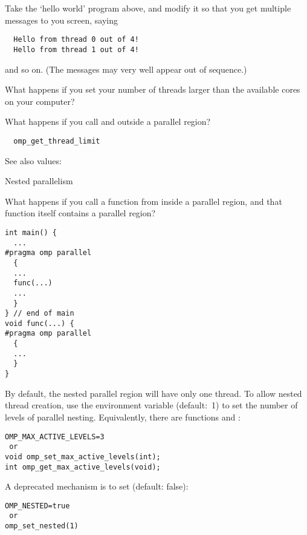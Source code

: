 \begin{exercise}
  Take the `hello world' program above, and modify it so that you get
  multiple messages to you screen, saying
\begin{verbatim}
  Hello from thread 0 out of 4!
  Hello from thread 1 out of 4!
\end{verbatim}
  and so on. (The messages may very well appear out of sequence.)


  What happens if you set your number of threads larger than the available
  cores on your computer?
\end{exercise}

\begin{exercise}
  What happens if you call  and 
  outside a parallel region?
\end{exercise}

\begin{lstlisting}
  omp_get_thread_limit
\end{lstlisting}

See also  values: 

 {Nested parallelism}
\label{sec:omp-levels}

What happens if you call a function from inside a parallel region, and
that function itself contains a parallel region?
\begin{lstlisting}
int main() {
  ...
#pragma omp parallel
  {
  ...
  func(...)
  ...
  }
} // end of main
void func(...) {
#pragma omp parallel
  {
  ...
  }
}
\end{lstlisting}

By default, the nested parallel region will have only one thread.
To allow nested thread creation,
use the environment variable
 (default:~1)
to set the number of levels of parallel nesting.
Equivalently, there are functions
 and :
\begin{verbatim}
OMP_MAX_ACTIVE_LEVELS=3
 or
void omp_set_max_active_levels(int);
int omp_get_max_active_levels(void);
\end{verbatim}

\begin{remark}
  A deprecated mechanism is to
  set  (default: false):
\begin{verbatim}
OMP_NESTED=true
 or
omp_set_nested(1)
\end{verbatim}
\end{remark}

